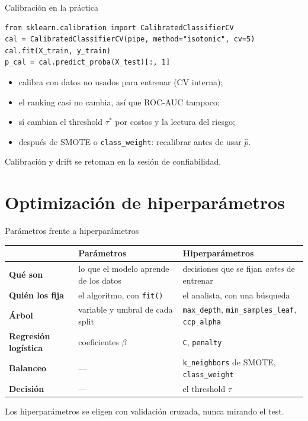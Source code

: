 \documentclass[aspectratio=169,12pt]{beamer}
\newcommand{\hrow}{\rowcolor{mlcream}}
\begin{document}
\begin{frame}[fragile]{Calibración en la práctica}
\begin{lstlisting}[basicstyle=\ttfamily\scriptsize,columns=fullflexible,keepspaces=true]
from sklearn.calibration import CalibratedClassifierCV
cal = CalibratedClassifierCV(pipe, method="isotonic", cv=5)
cal.fit(X_train, y_train)
p_cal = cal.predict_proba(X_test)[:, 1]
\end{lstlisting}
  \small
  \begin{itemize}
    \item calibra con datos no usados para entrenar (CV interna);
    \item el ranking casi no cambia, así que ROC-AUC tampoco;
    \item sí cambian el threshold $\tau^*$ por costos y la lectura del riesgo;
    \item después de SMOTE o \texttt{class\_weight}: recalibrar antes de usar $\hat{p}$.
  \end{itemize}
  \begin{keybox}[Continuidad]
    Calibración y drift se retoman en la sesión de confiabilidad.
  \end{keybox}
\end{frame}

\section{Optimización de hiperparámetros}

\begin{frame}{Parámetros frente a hiperparámetros}
  \centering\footnotesize
  \begin{tabular}{@{}l L{0.38\textwidth} L{0.38\textwidth}@{}}
    \toprule
    \hrow & \textbf{Parámetros} & \textbf{Hiperparámetros} \\
    \midrule
    \textbf{Qué son} & lo que el modelo aprende de los datos & decisiones que se fijan \emph{antes} de entrenar \\
    \textbf{Quién los fija} & el algoritmo, con \texttt{fit()} & el analista, con una búsqueda \\
    \textbf{Árbol} & variable y umbral de cada split & \texttt{max\_depth}, \texttt{min\_samples\_leaf}, \texttt{ccp\_alpha} \\
    \textbf{Regresión logística} & coeficientes $\beta$ & \texttt{C}, \texttt{penalty} \\
    \textbf{Balanceo} & --- & \texttt{k\_neighbors} de SMOTE, \texttt{class\_weight} \\
    \textbf{Decisión} & --- & el threshold $\tau$ \\
    \bottomrule
  \end{tabular}
  \raggedright
  \begin{keybox}
    Los hiperparámetros se eligen con validación cruzada, nunca mirando el test.
  \end{keybox}
\end{frame}
\end{document}
